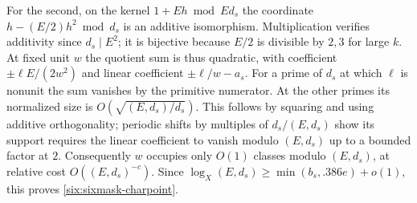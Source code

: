\documentclass[11pt,a4paper]{article}
\theoremstyle{paperplain}
\numberwithin{equation}{section}
\begin{document}
For the second, on the kernel $1+Eh\bmod Ed_s$ the coordinate
$h-(E/2)h^2\bmod d_s$ is an additive isomorphism. Multiplication
verifies additivity since $d_s\mid E^2$; it is bijective because
$E/2$ is divisible by $2,3$ for large $k$. At fixed unit $w$ the
quotient sum is thus quadratic, with coefficient
$\pm\ell E/(2w^2)$ and linear coefficient $\pm\ell/w-a_s$.
For a prime of $d_s$ at which $\ell$ is nonunit the sum vanishes
by the primitive numerator. At the other primes its normalized
size is $O(\sqrt{(E,d_s)/d_s})$. This follows by squaring and
using additive orthogonality; periodic shifts by multiples of
$d_s/(E,d_s)$ show its support requires the linear coefficient
to vanish modulo $(E,d_s)$ up to a bounded factor at $2$.
Consequently $w$ occupies only $O(1)$ classes modulo $(E,d_s)$,
at relative cost $O((E,d_s)^{-c})$. Since
$\log_X(E,d_s)\ge\min(b_s,.386 e)+o(1)$, this proves
\eqref{six:sixmask-charpoint}.
\end{document}
